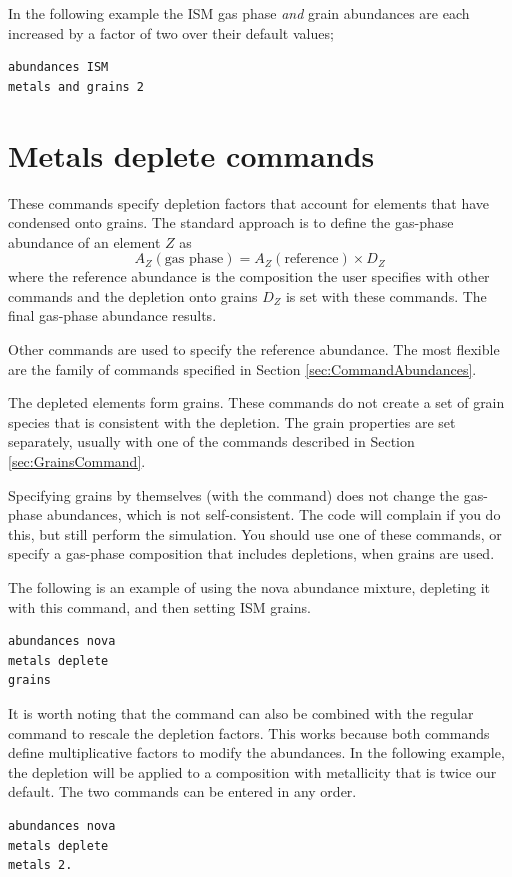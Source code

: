 In the following example the ISM gas phase \emph{and}
grain abundances are each
increased by a factor of two over their default values;
\begin{verbatim}
abundances ISM
metals and grains 2
\end{verbatim}

\section{Metals deplete commands}

These commands specify depletion factors that account for elements that
have condensed onto grains.  
The standard approach is to define the gas-phase abundance of an element $Z$ as
\begin{equation}
A_Z( \textrm{gas phase}) = A_Z( \textrm{reference}) \times  D_Z
\label{eqn:ISMdepletion}
\end{equation}
where the reference abundance is the composition the user specifies with other commands
and the depletion onto grains $D_Z$ is set with these commands.
The final gas-phase abundance results.

Other commands are used to specify the reference abundance.
The most flexible are the  family of commands specified
in Section \ref{sec:CommandAbundances}.

The depleted elements form grains.  
These commands do not create a set of grain species that is consistent
with the depletion.
The grain properties are set separately, usually with one of the
 commands described in Section \ref{sec:GrainsCommand}.

Specifying grains by themselves (with the  command)
does not change the gas-phase abundances,
which is not self-consistent.  The
code will complain if you do this, but still perform the simulation.
You should use one of these  commands, or specify
a gas-phase composition that includes depletions, when grains are used.

The following is an example of using
the nova abundance mixture, depleting it with this command,
and then setting ISM grains.
\begin{verbatim}
abundances nova
metals deplete
grains
\end{verbatim}


It is worth noting that the  command can also
be combined with the regular  command to rescale the
depletion factors. This works because both commands define multiplicative
factors to modify the abundances. In the following example, the depletion
will be applied to a composition with metallicity that is twice our default. 
The two  commands can be entered in any order.
\begin{verbatim}
abundances nova
metals deplete
metals 2.
\end{verbatim}

